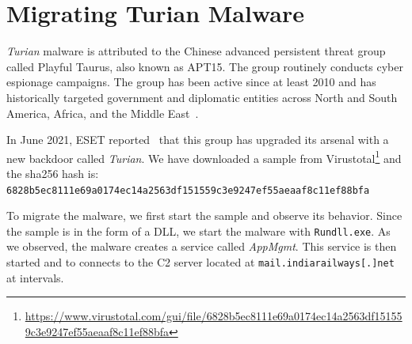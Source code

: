 \documentclass[a4paper, 11pt, english]{report}
\begin{document}
%
%


\section{Migrating Turian Malware}
\label{sec:turian}
\textit{Turian} malware is attributed to the Chinese advanced persistent threat group called Playful Taurus, also known as APT15. The group routinely conducts cyber espionage campaigns. The group has been active since at least 2010 and has historically targeted government and diplomatic entities across North and South America, Africa, and the Middle East~\cite{turianmalware2023}.

In June 2021, ESET reported~\cite{backdoordiplomacy2023} that this group has upgraded its arsenal with a new backdoor called \textit{Turian}. We have downloaded a sample from Virustotal\footnote{\tiny {\url{https://www.virustotal.com/gui/file/6828b5ec8111e69a0174ec14a2563df151559c3e9247ef55aeaaf8c11ef88bfa}}} and the sha256 hash is: \\ 
\texttt{6828b5ec8111e69a0174ec14a2563df151559c3e9247ef55aeaaf8c11ef88bfa}

To migrate the malware, we first start the sample and observe its behavior. Since the sample is in the form of a DLL, we start the malware with \texttt{Rundll.exe}. As we observed, the malware creates a service called \textit{AppMgmt}. This service is then started and to connects to the C2 server located at \texttt{mail.indiarailways[.]net} at intervals.
\end{document}
